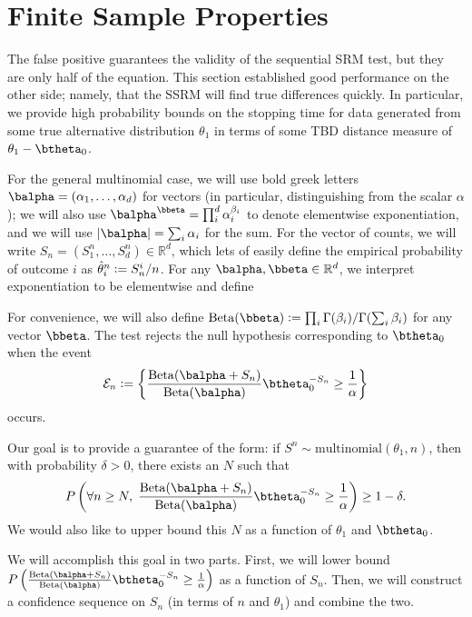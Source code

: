 \documentclass[11pt]{article}
\newcommand{\Reals}{\mathbb R}
\newcommand{\Beta}{\mathrm{Beta}}
\newcommand{\df}{\vcentcolon=}
\begin{document}
\section{Finite Sample Properties}
\label{app:finite_sample}
The false positive guarantees the validity of the sequential SRM test, but they are only half of the equation. This section established good performance on the other side; namely, that the SSRM will find true differences quickly. In particular, we provide high probability bounds on the stopping time for data generated from some true alternative distribution $\theta_1$ in terms of some TBD distance measure of $\theta_1 - \btheta_0$.

For the general multinomial case, we will use bold greek letters $\balpha = (\alpha_1,\ldots, \alpha_d)$ for vectors (in particular, distinguishing from the scalar $\alpha$); we will also use $\balpha^\bbeta = \prod_{i}^d \alpha_i^{\beta_i}$ to denote elementwise exponentiation, and we will use $|\balpha| = \sum_i\alpha_i$ for the sum. For the vector of counts, we will write $S_n=(S_1^n,\ldots, S_d^n)\in\Reals^d$, which lets of easily define the empirical probability of outcome $i$ as $\hat \theta_i^n \df S_n^i/n$. For any $\balpha,\bbeta\in\Reals^d$, we interpret exponentiation to be elementwise and define 

For convenience, we will also define $\Beta(\bbeta) \df \prod_i \Gamma(\beta_i) / \Gamma(\sum_i\beta_i)$ for any vector $\bbeta$. The test rejects the null hypothesis corresponding to $\btheta_0$ when the event
\begin{equation}\label{eq:multinomial.rejection.region}
  \mathcal E_n \df \left\{\frac{\Beta(\balpha + S_n)}
  {\Beta(\balpha)}
  \btheta_0 ^{-S_n} \geq \frac{1}{\alpha}\right\}
\end{equation}
occurs.

Our goal is to provide a guarantee of the form: if $S^n\sim\mathrm{multinomial}(\theta_1,n)$, then with probability $\delta>0$, there exists an $N$ such that 
\begin{equation*}
  P \left(\forall n \geq N,\;
      \frac{\Beta(\balpha + S_n)}
  {\Beta(\balpha)}
  \btheta_0 ^{-S_n} \geq \frac{1}{\alpha}
  \right) \geq 1-\delta.
\end{equation*}
We would also like to upper bound this $N$ as a function of $\theta_1$ and $\btheta_0$.

We will accomplish this goal in two parts. First, we will lower bound 
$
  P \left(
      \frac{\Beta(\balpha + S_n)}
  {\Beta(\balpha)}
  \btheta_0 ^{-S_n} \geq \frac{1}{\alpha}
  \right) 
$
as a function of $S_n$. Then, we will construct a confidence sequence on $S_n$ (in terms of $n$ and $\theta_1$) and combine the two.
\end{document}
